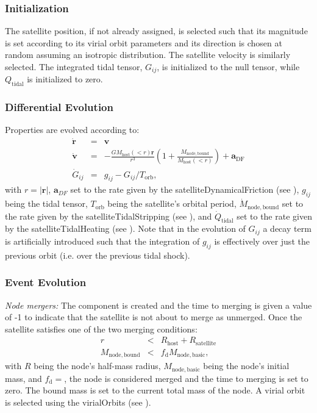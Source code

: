 \subsubsection{Initialization}

The satellite position, if not already assigned, is selected such that its magnitude is set according to its virial orbit parameters and its direction is chosen at random assuming an isotropic distribution.  The satellite velocity is similarly selected.  The integrated tidal tensor, $G_{ij}$, is initialized to the null tensor, while $Q_\mathrm{tidal}$ is initialized to zero.

\subsubsection{Differential Evolution}

Properties are evolved according to:
\begin{eqnarray}
\dot{\mathbf{r}}&=&\mathbf{v}\\
\dot{\mathbf{v}}&=&-\frac{G M_\mathrm{host}(<r)\mathbf{r}}{r^3}\left(1+\frac{M_\mathrm{node,bound}}{M_\mathrm{host}(<r)}\right)+\mathbf{a}_\mathrm{DF}\\
\dot{G}_{ij}&=&g_{ij}-G_{ij}/T_\mathrm{orb},
\end{eqnarray}
with $r=|\mathbf{r}|$, $\mathbf{a}_{DF}$ set to the rate given by the {\normalfont \ttfamily satelliteDynamicalFriction} (see ), $g_{ij}$ being the tidal tensor, $T_\mathrm{orb}$ being the satellite's orbital period, $\dot{M}_\mathrm{node,bound}$ set to the rate given by the {\normalfont \ttfamily satelliteTidalStripping} (see ), and $\dot{Q}_\mathrm{tidal}$ set to the rate given by the {\normalfont \ttfamily satelliteTidalHeating} (see ). Note that in the evolution of $G_{ij}$ a decay term is artificially introduced such that the integration of $g_{ij}$ is effectively over just the previous orbit (i.e. over the previous tidal shock).

\subsubsection{Event Evolution}

\noindent\emph{Node mergers:} The \gls{component} is created and the time to merging is given a value of -1 to indicate that the satellite is not about to merge as unmerged.  Once the satellite satisfies one of the two merging conditions:
\begin{eqnarray}
r&<&R_\mathrm{host}+R_\mathrm{satellite}\\
M_\mathrm{node,bound}&<&f_\mathrm{d} M_\mathrm{node,basic},
\end{eqnarray}
with $R$ being the node's half-mass radius, $M_\mathrm{node,basic}$ being the node's initial mass, and $f_\mathrm{d}=${\normalfont \ttfamily [satelliteOrbitingDestructionMassFraction]}, the node is considered merged and the time to merging is set to zero. The bound mass is set to the current total mass of the node. A virial orbit is selected using the {\normalfont \ttfamily virialOrbits} (see ). \\

